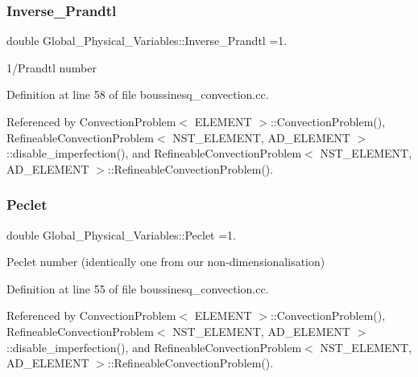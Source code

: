 \subsubsection{\texorpdfstring{Inverse\+\_\+\+Prandtl}{Inverse\_Prandtl}}
{\footnotesize\ttfamily double Global\+\_\+\+Physical\+\_\+\+Variables\+::\+Inverse\+\_\+\+Prandtl =1.}



1/\+Prandtl number 



Definition at line 58 of file boussinesq\+\_\+convection.\+cc.



Referenced by Convection\+Problem$<$ E\+L\+E\+M\+E\+N\+T $>$\+::\+Convection\+Problem(), Refineable\+Convection\+Problem$<$ N\+S\+T\+\_\+\+E\+L\+E\+M\+E\+N\+T, A\+D\+\_\+\+E\+L\+E\+M\+E\+N\+T $>$\+::disable\+\_\+imperfection(), and Refineable\+Convection\+Problem$<$ N\+S\+T\+\_\+\+E\+L\+E\+M\+E\+N\+T, A\+D\+\_\+\+E\+L\+E\+M\+E\+N\+T $>$\+::\+Refineable\+Convection\+Problem().

\mbox{\label{namespaceGlobal__Physical__Variables_ad4cdf142ba50635d62ac4c614f445af7}} 
\subsubsection{\texorpdfstring{Peclet}{Peclet}}
{\footnotesize\ttfamily double Global\+\_\+\+Physical\+\_\+\+Variables\+::\+Peclet =1.}



Peclet number (identically one from our non-\/dimensionalisation) 



Definition at line 55 of file boussinesq\+\_\+convection.\+cc.



Referenced by Convection\+Problem$<$ E\+L\+E\+M\+E\+N\+T $>$\+::\+Convection\+Problem(), Refineable\+Convection\+Problem$<$ N\+S\+T\+\_\+\+E\+L\+E\+M\+E\+N\+T, A\+D\+\_\+\+E\+L\+E\+M\+E\+N\+T $>$\+::disable\+\_\+imperfection(), and Refineable\+Convection\+Problem$<$ N\+S\+T\+\_\+\+E\+L\+E\+M\+E\+N\+T, A\+D\+\_\+\+E\+L\+E\+M\+E\+N\+T $>$\+::\+Refineable\+Convection\+Problem().

\mbox{\label{namespaceGlobal__Physical__Variables_a637fd2a6a7c5b34ed3288300d8bf84b7}} 
